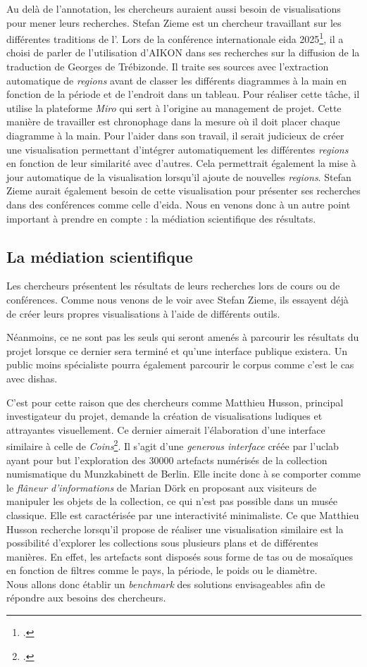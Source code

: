 Au delà de l'annotation, les chercheurs auraient aussi besoin de visualisations pour mener leurs recherches. Stefan Zieme est un chercheur travaillant sur les différentes traditions de l'\almageste. Lors de la conférence internationale \gls{eida} 2025\footcite{Conference2025Long2025}, il a choisi de parler de l'utilisation d'AIKON dans ses recherches sur la diffusion de la traduction de Georges de Trébizonde. Il traite ses sources avec l'extraction automatique de \textit{regions} avant de classer les différents diagrammes à la main en fonction de la période et de l'endroit dans un tableau. Pour réaliser cette tâche, il utilise la plateforme \textit{Miro} qui sert à l'origine au management de projet. Cette manière de travailler est chronophage dans la mesure où il doit placer chaque diagramme à la main. Pour l'aider dans son travail, il serait judicieux de créer une visualisation permettant d'intégrer automatiquement les différentes \textit{regions} en fonction de leur similarité avec d'autres. Cela permettrait également la mise à jour automatique de la visualisation lorsqu'il ajoute de nouvelles \textit{regions}.
Stefan Zieme aurait également besoin de cette visualisation pour présenter ses recherches dans des conférences comme celle d'\gls{eida}. Nous en venons donc à un autre point important à prendre en compte : la médiation scientifique des résultats. 

\subsection{La médiation scientifique}

Les chercheurs présentent les résultats de leurs recherches lors de cours ou de conférences. Comme nous venons de le voir avec Stefan Zieme, ils essayent déjà de créer leurs propres visualisations à l'aide de différents outils. 

Néanmoins, ce ne sont pas les seuls qui seront amenés à parcourir les résultats du projet lorsque ce dernier sera terminé et qu'une interface publique existera. Un public moins spécialiste pourra également parcourir le corpus comme c'est le cas avec \gls{dishas}.

C'est pour cette raison que des chercheurs comme Matthieu Husson, principal investigateur du projet, demande la création de visualisations ludiques et attrayantes visuellement. Ce dernier aimerait l'élaboration d'une interface similaire à celle de \textit{Coins}\footcite{COINSJourneyRich}. Il s'agit d'une \textit{generous interface} créée par l'\gls{uclab} ayant pour but l'exploration des 30000 artefacts numérisés de la collection numismatique du Munzkabinett de Berlin. Elle incite donc à se comporter comme le \og \textit{flâneur d'informations} \fg de Marian Dörk en proposant aux visiteurs de manipuler les objets de la collection, ce qui n'est pas possible dans un musée classique. Elle est caractérisée par une interactivité minimaliste. Ce que Matthieu Husson recherche lorsqu'il propose de réaliser une visualisation similaire est la possibilité d'explorer les collections sous plusieurs plans et de différentes manières. En effet, les artefacts sont disposés sous forme de tas ou de mosaïques en fonction de filtres comme le pays, la période, le poids ou le diamètre. \\

Nous allons donc établir un \textit{benchmark} des solutions envisageables afin de répondre aux besoins des chercheurs.
